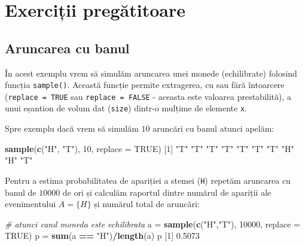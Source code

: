 \documentclass[]{article}
\newenvironment{Shaded}{\begin{snugshade}}{\end{snugshade}}
\newcommand{\KeywordTok}[1]{\textcolor[rgb]{0.13,0.29,0.53}{\textbf{#1}}}
\newcommand{\DataTypeTok}[1]{\textcolor[rgb]{0.13,0.29,0.53}{#1}}
\newcommand{\DecValTok}[1]{\textcolor[rgb]{0.00,0.00,0.81}{#1}}
\newcommand{\FloatTok}[1]{\textcolor[rgb]{0.00,0.00,0.81}{#1}}
\newcommand{\StringTok}[1]{\textcolor[rgb]{0.31,0.60,0.02}{#1}}
\newcommand{\CommentTok}[1]{\textcolor[rgb]{0.56,0.35,0.01}{\textit{#1}}}
\newcommand{\OtherTok}[1]{\textcolor[rgb]{0.56,0.35,0.01}{#1}}
\newcommand{\OperatorTok}[1]{\textcolor[rgb]{0.81,0.36,0.00}{\textbf{#1}}}
\newcommand{\NormalTok}[1]{#1}
\begin{document}
\section{Exerciții pregătitoare}\label{exercitii-pregatitoare}

\subsection{Aruncarea cu banul}\label{aruncarea-cu-banul}

În acest exemplu vrem să simulăm aruncarea unei monede (echilibrate)
folosind funcția \texttt{sample()}. Această funcție permite extragerea,
cu sau fără întoarcere (\texttt{replace\ =\ TRUE} sau
\texttt{replace\ =\ FALSE} - aceasta este valoarea prestabilită), a unui
eșantion de volum dat (\texttt{size}) dintr-o mulțime de elemente
\texttt{x}.

Spre exemplu dacă vrem să simulăm \(10\) aruncări cu banul atunci
apelăm:

\begin{Shaded}
\begin{Highlighting}[]
\KeywordTok{sample}\NormalTok{(}\KeywordTok{c}\NormalTok{(}\StringTok{"H"}\NormalTok{, }\StringTok{"T"}\NormalTok{), }\DecValTok{10}\NormalTok{, }\DataTypeTok{replace =} \OtherTok{TRUE}\NormalTok{)}
\NormalTok{ [}\DecValTok{1}\NormalTok{] }\StringTok{"T"} \StringTok{"T"} \StringTok{"T"} \StringTok{"T"} \StringTok{"T"} \StringTok{"T"} \StringTok{"T"} \StringTok{"H"} \StringTok{"H"} \StringTok{"T"}
\end{Highlighting}
\end{Shaded}

Pentru a estima probabilitatea de apariției a stemei (\texttt{H})
repetăm aruncarea cu banul de \(10000\) de ori și calculăm raportul
dintre numărul de apariții ale evenimentului \(A=\{H\}\) și numărul
total de aruncări:

\begin{Shaded}
\begin{Highlighting}[]
\CommentTok{# atunci cand moneda este echilibrata}
\NormalTok{a =}\StringTok{ }\KeywordTok{sample}\NormalTok{(}\KeywordTok{c}\NormalTok{(}\StringTok{"H"}\NormalTok{,}\StringTok{"T"}\NormalTok{), }\DecValTok{10000}\NormalTok{, }\DataTypeTok{replace =} \OtherTok{TRUE}\NormalTok{)}
\NormalTok{p =}\StringTok{ }\KeywordTok{sum}\NormalTok{(a }\OperatorTok{==}\StringTok{ "H"}\NormalTok{)}\OperatorTok{/}\KeywordTok{length}\NormalTok{(a)}
\NormalTok{p}
\NormalTok{[}\DecValTok{1}\NormalTok{] }\FloatTok{0.5073}
\end{Highlighting}
\end{Shaded}
\end{document}
